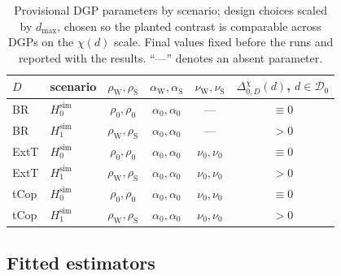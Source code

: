 \begin{table}[t]
  \centering
  \caption{Provisional DGP parameters by scenario; design choices scaled by \(d_{\max}\), chosen so the planted contrast is comparable across DGPs on the \(\chi(d)\) scale. Final values fixed before the runs and reported with the results. ``---'' denotes an absent parameter.}
  \label{tab:sim-scenarios}
  {\small
    \begin{tabular}{llcccc}
      \hline
      \(D\) & scenario               & \(\rho_{\mathrm W},\rho_{\mathrm S}\) & \(\alpha_{\mathrm W},\alpha_{\mathrm S}\) & \(\nu_{\mathrm W},\nu_{\mathrm S}\) & \(\Delta_{0,D}^{\chi}(d)\), \(d\in\mathcal D_0\) \\
      \hline
      BR    & \(H_0^{\mathrm{sim}}\) & \(\rho_0,\rho_0\)                     & \(\alpha_0,\alpha_0\)                     & ---                                 & \(\equiv0\)                                      \\
      BR    & \(H_1^{\mathrm{sim}}\) & \(\rho_{\mathrm W},\rho_{\mathrm S}\) & \(\alpha_0,\alpha_0\)                     & ---                                 & \(>0\)                                           \\
      ExtT  & \(H_0^{\mathrm{sim}}\) & \(\rho_0,\rho_0\)                     & \(\alpha_0,\alpha_0\)                     & \(\nu_0,\nu_0\)                     & \(\equiv0\)                                      \\
      ExtT  & \(H_1^{\mathrm{sim}}\) & \(\rho_{\mathrm W},\rho_{\mathrm S}\) & \(\alpha_0,\alpha_0\)                     & \(\nu_0,\nu_0\)                     & \(>0\)                                           \\
      tCop  & \(H_0^{\mathrm{sim}}\) & \(\rho_0,\rho_0\)                     & \(\alpha_0,\alpha_0\)                     & \(\nu_0,\nu_0\)                     & \(\equiv0\)                                      \\
      tCop  & \(H_1^{\mathrm{sim}}\) & \(\rho_{\mathrm W},\rho_{\mathrm S}\) & \(\alpha_0,\alpha_0\)                     & \(\nu_0,\nu_0\)                     & \(>0\)                                           \\
      \hline
    \end{tabular}}
\end{table}

\subsection{Fitted estimators}\label{sec:sim-est}

